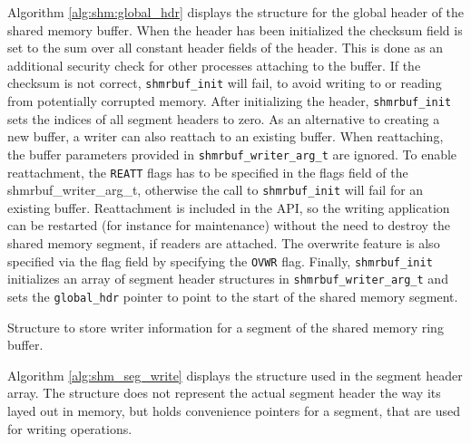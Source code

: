 Algorithm \ref{alg:shm:global_hdr} displays the structure for the global header of the shared memory buffer. When the header has been initialized
the checksum field is set to the sum over all constant header fields of the header. This is done as an additional security check for other processes attaching to the buffer. 
If the checksum is not correct, \texttt{shmrbuf\_init} will fail, to avoid writing to or reading from potentially corrupted memory. After initializing the header,
\texttt{shmrbuf\_init} sets the indices of all segment headers to zero. As an alternative to creating a new buffer,
a writer can also reattach to an existing buffer. When reattaching, the buffer parameters provided in \texttt{shmrbuf\_writer\_arg\_t} are ignored. To enable reattachment, the \texttt{REATT} flags has to be specified in the flags field of the shmrbuf\_writer\_arg\_t, otherwise the call   
to \texttt{shmrbuf\_init} will fail for an existing buffer. Reattachment is included in the API, so the writing application can be restarted (for instance for maintenance) without the need to
destroy the shared memory segment, if readers are attached. The overwrite feature is also specified via the flag field by specifying the \texttt{OVWR} flag.
Finally, \texttt{shmrbuf\_init} initializes an array of segment header structures in \texttt{shmrbuf\_writer\_arg\_t} and sets the \texttt{global\_hdr} pointer to point to the start of the shared memory segment.

\begin{algorithm}[h!]
    
    \label{alg:shm_seg_write}
    \caption[Shared Memory Ringbuffer: Writer Segment Header]{Structure to store writer information for a segment of the shared memory ring buffer.}
\end{algorithm}
Algorithm \ref{alg:shm_seg_write} displays the structure  used in the segment header array. The structure does not represent the actual segment header the way its layed out in memory, but holds convenience pointers for a segment, that are used for writing operations.   
   
